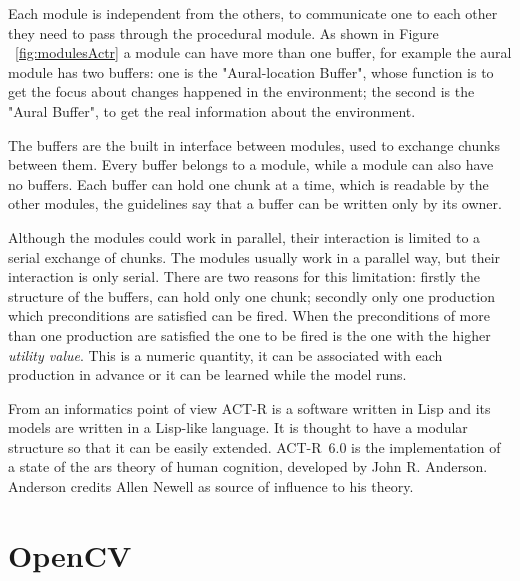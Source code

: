 Each module is independent from the others, to communicate one to each other they need to pass through the procedural module. As shown in Figure  ~\ref{fig:modulesActr} a module can have more than one buffer, for example the aural module has two buffers: one is the "Aural-location Buffer", whose function is to get the focus about changes happened in the environment; the second is the "Aural Buffer", to get the real information about the environment.

The buffers are the built in interface between modules, used to exchange chunks between them. Every buffer belongs to a module, while a module can also have no buffers. Each buffer can hold one chunk at a time, which is readable by the other modules, the guidelines say that a buffer can be written only by its owner. 

Although the modules could work in parallel, their interaction is limited to a serial exchange of chunks. The modules usually work in a parallel way, but their interaction is only serial. There are two reasons for this limitation: firstly the structure of the buffers, can hold only one chunk; secondly only one production which preconditions are satisfied can be fired. When the preconditions of more than one production are satisfied the one to be fired is the one with the higher \emph{utility value}. This is a numeric quantity, it can be associated with each production in advance or it can be learned while the model runs.



From an informatics point of view \mbox{ACT-R} is a software written in Lisp and its models are written in a Lisp-like language. It is thought to have a modular structure so that it can be easily extended. \mbox{ACT-R 6.0} is the implementation of a state of the ars theory of human cognition, developed by John R. Anderson. Anderson credits Allen Newell as source of influence to his theory.
\newpage
\section{OpenCV}
